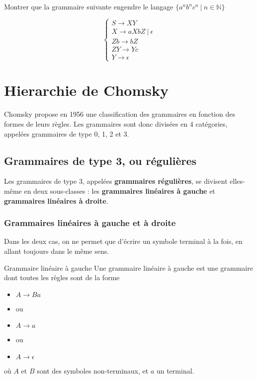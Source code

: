 \begin{exercice}
\label{grammanbncn}
Montrer que la grammaire suivante engendre le langage $\{a^nb^nc^n ~|~ n \in \mathbb{N}\}$

\[
\begin{cases}
S \rightarrow XY \\
X \rightarrow aXbZ~|~\epsilon\\
Zb \rightarrow bZ \\
ZY \rightarrow Yc \\
Y \rightarrow \epsilon
\end{cases}
\]
\end{exercice}

\section{Hierarchie de Chomsky}

Chomsky propose en 1956 une classification des grammaires en fonction des formes de leurs règles. Les grammaires sont donc divisées en 4 catégories, appelées grammaires de type 0, 1, 2 et 3.

\subsection{Grammaires de type 3, ou régulières}

Les grammaires de type 3, appelées \textbf{grammaires régulières}, se divisent elles-même en deux sous-classes : les \textbf{grammaires linéaires à gauche} et \textbf{grammaires linéaires à droite}.

\subsubsection{Grammaires linéaires à gauche et à droite}

Dans les deux cas, on ne permet que d'écrire un symbole terminal à la fois, en allant toujours dans le même sens.

\begin{definition}{Grammaire linéaire à gauche}{}
Une grammaire linéaire à gauche est une grammaire dont toutes les règles sont de la forme 
\begin{itemize}
\item[] $A \rightarrow Ba$
\item[] ou
\item[] $A \rightarrow a$
\item[] ou
\item[] $A \rightarrow \epsilon$
\end{itemize}

où $A$ et $B$ sont des symboles non-terminaux, et $a$ un terminal.
\end{definition}

